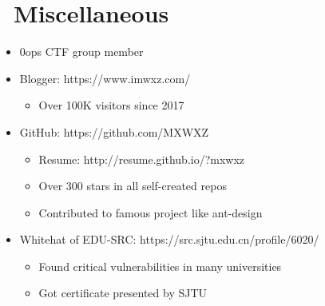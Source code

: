\documentclass{resume}
\begin{document}
\section{\faInfo\ Miscellaneous}
\begin{itemize}[parsep=0.5ex]
    \item 0ops CTF group member
    \item Blogger: https://www.imwxz.com/
          \begin{itemize}
              \item Over 100K visitors since 2017
          \end{itemize}
    \item GitHub: https://github.com/MXWXZ
          \begin{itemize}
              \item Resume: http://resume.github.io/?mxwxz
              \item Over 300 stars in all self-created repos
              \item Contributed to famous project like ant-design
          \end{itemize}
    \item Whitehat of EDU-SRC: https://src.sjtu.edu.cn/profile/6020/
          \begin{itemize}
              \item Found critical vulnerabilities in many universities
              \item Got certificate presented by SJTU
          \end{itemize}
\end{itemize}

%
%
\end{document}
